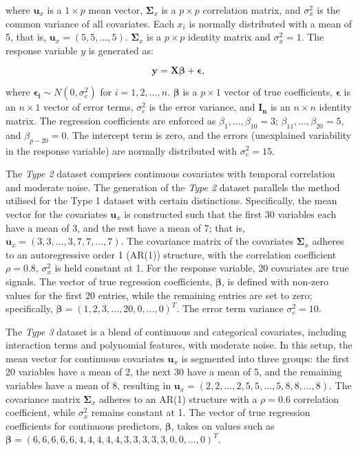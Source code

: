 \documentclass[
  11pt,
]{article}
\begin{document}
where \(\mathbf{u}_x\) is a \(1 \times p\) mean vector,
\(\mathbf{\Sigma}_x\) is a \(p \times p\) correlation matrix, and
\(\sigma_x^2\) is the common variance of all covariates. Each \(x_i\) is
normally distributed with a mean of 5, that is,
\(\mathbf{u}_x = (5, 5, \ldots, 5)\). \(\mathbf{\Sigma}_x\) is a
\(p \times p\) identity matrix and \(\sigma_x^2 = 1\). The response
variable \(y\) is generated as:

\begin{equation}
\mathbf{y} = \mathbf{X}\boldsymbol{\beta} + \boldsymbol{\epsilon},
\end{equation}

where \(\boldsymbol{\epsilon_i} \sim N(0, \sigma_e^2)\) for
\(i = 1, 2, \ldots, n\). \(\boldsymbol{\beta}\) is a \(p \times 1\)
vector of true coefficients, \(\boldsymbol{\epsilon}\) is an
\(n \times 1\) vector of error terms, \(\sigma_e^2\) is the error
variance, and \(\mathbf{I_n}\) is an \(n \times n\) identity matrix. The
regression coefficients are enforced as
\(\beta_1, \ldots, \beta_{10} = 3\);
\(\beta_{11}, \ldots, \beta_{20} = 5\), and \(\beta_{p-20} = 0\). The
intercept term is zero, and the errors (unexplained variability in the
response variable) are normally distributed with \(\sigma_e^2 = 15\).

\hfill\break

The \emph{Type 2} dataset comprises continuous covariates with temporal
correlation and moderate noise. The generation of the \emph{Type 2}
dataset parallels the method utilised for the Type 1 dataset with
certain distinctions. Specifically, the mean vector for the covariates
\(\mathbf{u}_x\) is constructed such that the first 30 variables each
have a mean of 3, and the rest have a mean of 7; that is,
\(\mathbf{u}_x = (3, 3, \ldots, 3, 7, 7, \ldots, 7)\). The covariance
matrix of the covariates \(\mathbf{\Sigma}_x\) adheres to an
autoregressive order 1 (AR(1)) structure, with the correlation
coefficient \(\rho = 0.8\), \(\sigma_x^2\) is held constant at 1. For
the response variable, 20 covariates are true signals. The vector of
true regression coefficients, \(\boldsymbol{\beta}\), is defined with
non-zero values for the first 20 entries, while the remaining entries
are set to zero; specifically,
\(\boldsymbol{\beta} = (1, 2, 3, \ldots, 20, 0, \ldots, 0)^T\). The
error term variance \(\sigma_e^2 = 10\).

\hfill\break

The \emph{Type 3} dataset is a blend of continuous and categorical
covariates, including interaction terms and polynomial features, with
moderate noise. In this setup, the mean vector for continuous covariates
\(\mathbf{u}_x\) is segmented into three groups: the first 20 variables
have a mean of 2, the next 30 have a mean of 5, and the remaining
variables have a mean of 8, resulting in
\(\mathbf{u}_x = (2, 2, \ldots, 2, 5, 5, \ldots, 5, 8, 8, \ldots, 8)\).
The covariance matrix \(\mathbf{\Sigma}_x\) adheres to an AR(1)
structure with a \(\rho = 0.6\) correlation coefficient, while
\(\sigma_x^2\) remains constant at 1. The vector of true regression
coefficients for continuous predictors, \(\boldsymbol{\beta}\), takes on
values such as
\(\boldsymbol{\beta} = (6, 6, 6, 6, 6, 4, 4, 4, 4, 4, 3, 3, 3, 3, 3, 0, 0, \ldots, 0)^T\).
\end{document}
